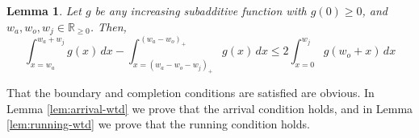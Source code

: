 \documentclass[11pt]{article}
\newtheorem{lemma}{Lemma}[section]
\newcommand{\R}{{\mathbb R}}
\newcommand{\tsty}{}
\begin{document}
\begin{lemma}
  \label{lem:concave-arrival}
  Let $g$ be any increasing subadditive function with $g(0) \geq 0$, and $w_a, w_o, w_j \in \R_{\geq 0}$.
  Then,
  \begin{equation*}
    \tsty \int_{x=w_a}^{w_a + w_j} g(x) \,dx - \int_{x = (w_a - w_o -
      w_j)_{+}}^{(w_a - w_o)_{+}} g(x) \,dx \leq 2 \int_{x=0}^{w_j} g(w_o
    + x) \,dx
  \end{equation*}
\end{lemma}

That the boundary and completion conditions are satisfied are obvious.
In Lemma \ref{lem:arrival-wtd} we prove that the arrival condition holds,
and in Lemma \ref{lem:running-wtd} we prove that the running condition holds.
\end{document}
